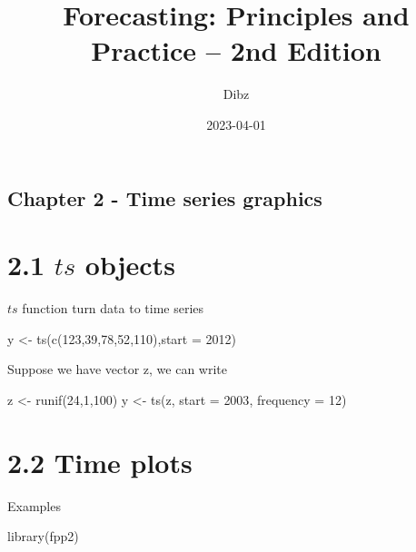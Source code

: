 \documentclass[
]{article}
\title{Forecasting: Principles and Practice -- 2nd Edition}
\author{Dibz}
\date{2023-04-01}
\newenvironment{Shaded}{\begin{snugshade}}{\end{snugshade}}
\newcommand{\AttributeTok}[1]{\textcolor[rgb]{0.77,0.63,0.00}{#1}}
\newcommand{\DecValTok}[1]{\textcolor[rgb]{0.00,0.00,0.81}{#1}}
\newcommand{\FunctionTok}[1]{\textcolor[rgb]{0.00,0.00,0.00}{#1}}
\newcommand{\NormalTok}[1]{#1}
\newcommand{\OtherTok}[1]{\textcolor[rgb]{0.56,0.35,0.01}{#1}}
\begin{document}
\maketitle

\hypertarget{chapter-2---time-series-graphics}{%
\subsection{Chapter 2 - Time series
graphics}\label{chapter-2---time-series-graphics}}

\hypertarget{ts-objects}{%
\section{\texorpdfstring{2.1 \(ts\)
objects}{2.1 ts objects}}\label{ts-objects}}

\(ts\) function turn data to time series

\begin{Shaded}
\begin{Highlighting}[]
\NormalTok{y }\OtherTok{\textless{}{-}} \FunctionTok{ts}\NormalTok{(}\FunctionTok{c}\NormalTok{(}\DecValTok{123}\NormalTok{,}\DecValTok{39}\NormalTok{,}\DecValTok{78}\NormalTok{,}\DecValTok{52}\NormalTok{,}\DecValTok{110}\NormalTok{),}\AttributeTok{start =} \DecValTok{2012}\NormalTok{)}
\end{Highlighting}
\end{Shaded}

Suppose we have vector z, we can write

\begin{Shaded}
\begin{Highlighting}[]
\NormalTok{z }\OtherTok{\textless{}{-}} \FunctionTok{runif}\NormalTok{(}\DecValTok{24}\NormalTok{,}\DecValTok{1}\NormalTok{,}\DecValTok{100}\NormalTok{)}
\NormalTok{y }\OtherTok{\textless{}{-}} \FunctionTok{ts}\NormalTok{(z, }\AttributeTok{start =} \DecValTok{2003}\NormalTok{, }\AttributeTok{frequency =} \DecValTok{12}\NormalTok{)}
\end{Highlighting}
\end{Shaded}

\hypertarget{time-plots}{%
\section{2.2 Time plots}\label{time-plots}}

Examples

\begin{Shaded}
\begin{Highlighting}[]
\FunctionTok{library}\NormalTok{(fpp2)}
\end{Highlighting}
\end{Shaded}
\end{document}
